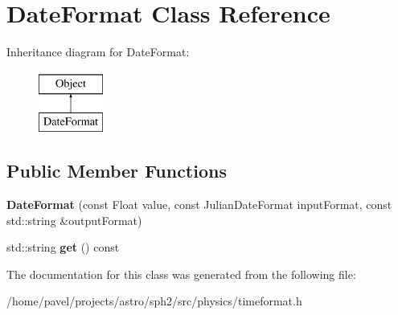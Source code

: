 \hypertarget{classDateFormat}{}\section{Date\+Format Class Reference}
\label{classDateFormat}
Inheritance diagram for Date\+Format\+:\begin{figure}[H]
\begin{center}
\leavevmode
\includegraphics[height=2.000000cm]{classDateFormat}
\end{center}
\end{figure}
\subsection*{Public Member Functions}
\begin{DoxyCompactItemize}
\item 
\hypertarget{classDateFormat_a4a44523d5371920bbb4967fce29a9544}{}\label{classDateFormat_a4a44523d5371920bbb4967fce29a9544} 
{\bfseries Date\+Format} (const Float value, const Julian\+Date\+Format input\+Format, const std\+::string \&output\+Format)
\item 
\hypertarget{classDateFormat_ab391ba82767ede94c6951e1ba61afcef}{}\label{classDateFormat_ab391ba82767ede94c6951e1ba61afcef} 
std\+::string {\bfseries get} () const
\end{DoxyCompactItemize}


The documentation for this class was generated from the following file\+:\begin{DoxyCompactItemize}
\item 
/home/pavel/projects/astro/sph2/src/physics/timeformat.\+h\end{DoxyCompactItemize}
